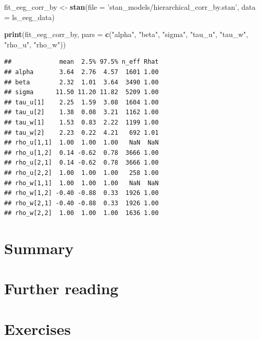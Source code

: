 \documentclass[12pt,]{krantz}
\newenvironment{Shaded}{\begin{snugshade}}{\end{snugshade}}
\newcommand{\DataTypeTok}[1]{\textcolor[rgb]{0.13,0.29,0.53}{#1}}
\newcommand{\KeywordTok}[1]{\textcolor[rgb]{0.13,0.29,0.53}{\textbf{#1}}}
\newcommand{\NormalTok}[1]{#1}
\newcommand{\StringTok}[1]{\textcolor[rgb]{0.31,0.60,0.02}{#1}}
\theoremstyle{definition}
\theoremstyle{definition}
\theoremstyle{definition}
\theoremstyle{remark}
\begin{document}
\begin{Shaded}
\begin{Highlighting}[]
\NormalTok{fit_eeg_corr_by <-}\StringTok{ }\KeywordTok{stan}\NormalTok{(}\DataTypeTok{file =} \StringTok{'stan_models/hierarchical_corr_by.stan'}\NormalTok{, }
                 \DataTypeTok{data =}\NormalTok{ ls_eeg_data)}
\end{Highlighting}
\end{Shaded}

\begin{Shaded}
\begin{Highlighting}[]
\KeywordTok{print}\NormalTok{(fit_eeg_corr_by, }\DataTypeTok{pars =}
                       \KeywordTok{c}\NormalTok{(}\StringTok{"alpha"}\NormalTok{, }\StringTok{"beta"}\NormalTok{, }\StringTok{"sigma"}\NormalTok{, }\StringTok{"tau_u"}\NormalTok{, }\StringTok{"tau_w"}\NormalTok{, }\StringTok{"rho_u"}\NormalTok{, }\StringTok{"rho_w"}\NormalTok{))}
\end{Highlighting}
\end{Shaded}

\begin{verbatim}
##             mean  2.5% 97.5% n_eff Rhat
## alpha       3.64  2.76  4.57  1601 1.00
## beta        2.32  1.01  3.64  3490 1.00
## sigma      11.50 11.20 11.82  5209 1.00
## tau_u[1]    2.25  1.59  3.08  1604 1.00
## tau_u[2]    1.38  0.08  3.21  1162 1.00
## tau_w[1]    1.53  0.83  2.22  1199 1.00
## tau_w[2]    2.23  0.22  4.21   692 1.01
## rho_u[1,1]  1.00  1.00  1.00   NaN  NaN
## rho_u[1,2]  0.14 -0.62  0.78  3666 1.00
## rho_u[2,1]  0.14 -0.62  0.78  3666 1.00
## rho_u[2,2]  1.00  1.00  1.00   258 1.00
## rho_w[1,1]  1.00  1.00  1.00   NaN  NaN
## rho_w[1,2] -0.40 -0.88  0.33  1926 1.00
## rho_w[2,1] -0.40 -0.88  0.33  1926 1.00
## rho_w[2,2]  1.00  1.00  1.00  1636 1.00
\end{verbatim}

\hypertarget{summary-7}{%
\section{Summary}\label{summary-7}}

\hypertarget{further-reading-9}{%
\section{Further reading}\label{further-reading-9}}

\hypertarget{exercises-8}{%
\section{Exercises}\label{exercises-8}}
\end{document}
